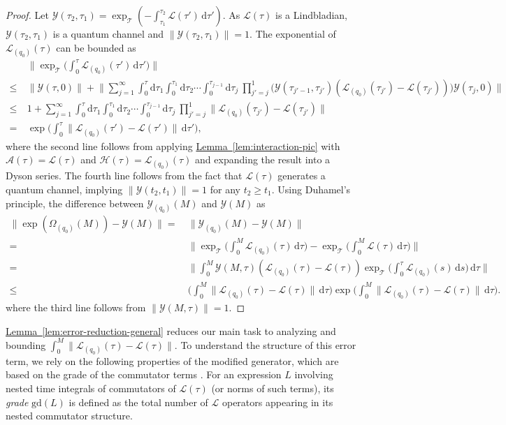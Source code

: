 \documentclass[11pt]{article}
\newcommand{\lem}[1]{\hyperref[lem:#1]{Lemma~\ref*{lem:#1}}}
\renewcommand{\d}{\mathrm{d}}
\newcommand{\mc}{\mathcal}
\begin{document}
\begin{proof}
Let $\mc Y(\tau_2, \tau_1) = \exp_{\mc T}(-\int_{\tau_1}^{\tau_2}\mc L(\tau')\,\d \tau' )$. As $\mc L(\tau)$ is a Lindbladian, $\mc Y(\tau_2, \tau_1)$ is a quantum channel and $\|\mc Y(\tau_2, \tau_1)\| = 1$. The exponential of $\mc L_{(q_0)}(\tau)$ can be bounded as
\begin{align*}
 &\bigg\|\exp_{\mc T}\bigg(\int_{0}^{\tau} \mc L_{(q_0)}(\tau')\,\d \tau'\bigg)\bigg\| \\
 \le ~& \|\mc Y(\tau,0)\|+\bigg\|\sum_{j=1}^{\infty}\int_{0}^{\tau}\d \tau_1\int_0^{\tau_1}\d \tau_2 \cdots \int_{0}^{\tau_{j-1}}\d \tau_j~\prod_{j'=j}^{1}\Big(\mc Y(\tau_{j'-1},\tau_{j'})(\mc L_{(q_0)}(\tau_{j'})-\mc L(\tau_{j'}))\Big)\mc Y(\tau_j,0)\bigg\|\\
 \le ~&1+\sum_{j=1}^{\infty}\int_{0}^{\tau}\d \tau_1\int_0^{\tau_1}\d \tau_2 \cdots \int_{0}^{\tau_{j-1}}\d \tau_j~\prod_{j'=j}^{1}\| \mc L_{(q_0)}(\tau_{j'})-\mc L(\tau_{j'})\|\\
 =~& \exp\bigg(\int_{0}^{\tau}\| \mc L_{(q_0)}(\tau')-\mc L(\tau')\|\,\d \tau'\bigg),
\end{align*}
where the second line follows from applying \lem{interaction-pic} with $\mc A(\tau) = \mc L(\tau)$ and $\mc H(\tau)= \mc L_{(q_0)}(\tau)$ and expanding the result into a Dyson series. The fourth line follows from the fact that $\mc L(\tau)$ generates a quantum channel, implying $\|\mc Y(t_2, t_1)\| = 1$ for any $t_2 \ge t_1$. 
Using Duhamel's principle, the difference between $\mc Y_{(q_0)}(M)$ and $\mc Y(M)$ as
\begin{align*}
 \|\exp(\Omega_{(q_0)}(M)) -\mc Y(M)\|=&~ \|\mc Y_{(q_0)}(M) -\mc Y(M)\|\\
 =&~\bigg\|\exp_{\mc T}\bigg(\int_{0}^{M} \mc L_{(q_0)}(\tau)\,\d \tau\bigg)-\exp_{\mc T}\bigg(\int_{0}^{M} \mc L(\tau)\,\d \tau\bigg)\bigg\| \\
 =&~\bigg\|\int_{0}^{M} \mc Y(M, \tau)(\mc L_{(q_0)}(\tau)-\mc L(\tau)) \exp_{\mc T}\bigg(\int_{0}^\tau \mc L_{(q_0)}(s)\,\d s\bigg)\,\d \tau\bigg\| \\
 \le&~\bigg( \int_{0}^{M}\| \mc L_{(q_0)}(\tau)-\mc L(\tau)\|\,\d \tau\bigg)\exp\bigg(\int_{0}^{M}\| \mc L_{(q_0)}(\tau)-\mc L(\tau)\|\,\d \tau\bigg).
\end{align*}
where the third line follows from $\|\mc Y(M,\tau)\| = 1$.
\end{proof}

\lem{error-reduction-general} reduces our main task to analyzing and bounding $\int_{0}^{M}\| \mc{L}_{(q_0)}(\tau)-\mc{L}(\tau)\|$. To understand the structure of this error term, we rely on the following properties of the modified generator, which are based on the grade of the commutator terms \cite{fang2025high}. For an expression $L$ involving nested time integrals of commutators of $\mc L(\tau)$ (or norms of such terms), its \emph{grade} $\mathrm{gd}(L)$ is defined as the total number of $\mc L$ operators appearing in its nested commutator structure.
\end{document}
